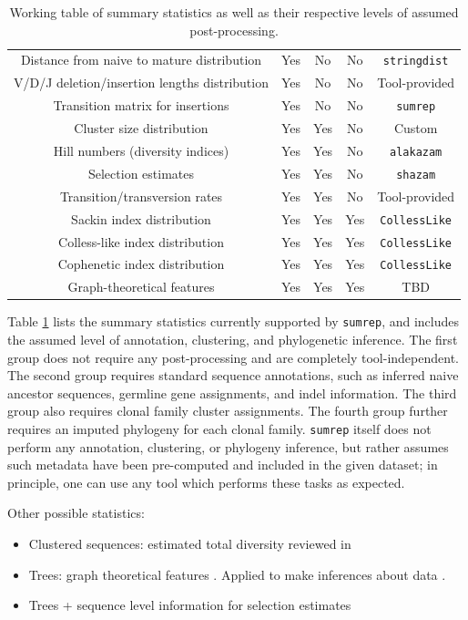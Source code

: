 \documentclass{article}
\begin{document}
\begin{table}
{\begin{tabular}{c|c|c|c|c}
Distance from naive to mature distribution & Yes & No & No & \texttt{stringdist} \\
V/D/J deletion/insertion lengths distribution & Yes & No & No & Tool-provided \\
Transition matrix for insertions & Yes & No & No & \texttt{sumrep} \\
\hline
Cluster size distribution & Yes & Yes & No & Custom \\
Hill numbers (diversity indices) & Yes & Yes & No & \texttt{alakazam} \\
Selection estimates & Yes & Yes & No & \texttt{shazam} \\
Transition/transversion rates & Yes & Yes & No & Tool-provided \\
\hline
Sackin index distribution & Yes & Yes & Yes & \texttt{CollessLike} \\
Colless-like index distribution & Yes & Yes & Yes & \texttt{CollessLike} \\
Cophenetic index distribution & Yes & Yes & Yes & \texttt{CollessLike} \\
Graph-theoretical features & Yes & Yes & Yes & TBD \\
\end{tabular}
}
\caption{Working table of summary statistics as well as their respective levels of assumed post-processing.}
\label{tab:SummaryStatistics}
\end{table}

Table \ref{tab:SummaryStatistics} lists the summary statistics currently supported by \texttt{sumrep}, and includes the assumed level of annotation, clustering, and phylogenetic inference.
The first group does not require any post-processing and are completely tool-independent.
The second group requires standard sequence annotations, such as inferred naive ancestor sequences, germline gene assignments, and indel information.
The third group also requires clonal family cluster assignments.
The fourth group further requires an imputed phylogeny for each clonal family.
\texttt{sumrep} itself does not perform any annotation, clustering, or phylogeny inference, but rather assumes such metadata have been pre-computed and included in the given dataset; in principle, one can use any tool which performs these tasks as expected.

Other possible statistics:

\begin{itemize}
\item Clustered sequences: estimated total diversity reviewed in \cite{Mehr2012-se}
\item Trees: graph theoretical features \cite{Dunn-Walters2002-cu,Dunn-Walters2004-hv,Mehr2004-ej,Shahaf2008-cc,Budeus2015-ab,Yaari2015-ss}.
Applied to make inferences about data \cite{Steiman-Shimony2006-fm}.
\item Trees + sequence level information for selection estimates \cite{Uduman2014-pb}
\end{itemize}
\end{document}
